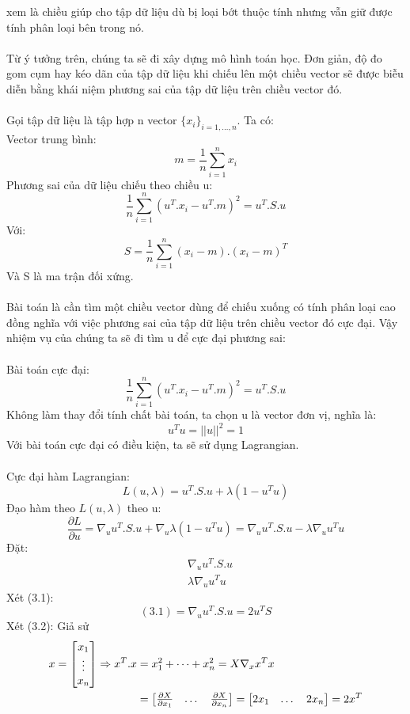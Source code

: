 xem là chiều giúp cho tập dữ liệu dù bị loại bớt thuộc tính nhưng vẫn giữ được
tính phân loại bên trong nó.\\\\ 
 Từ ý tưởng trên, chúng ta sẽ đi xây dựng
mô hình toán học. Đơn giản, độ đo gom cụm hay kéo dãn của tập dữ liệu khi chiếu
lên một chiều vector sẽ được biễu diễn bằng khái niệm phương sai của tập dữ liệu
trên chiều vector đó.\\\\
Gọi tập dữ liệu là tập hợp n vector $\{x_i\}_{i=1,\dots,n}$. Ta có:\\
Vector trung bình:
\[ m = \frac{1}{n} \sum_{i=1}^{n} x_i \]
Phương sai của dữ liệu chiếu theo chiều u:
\[ \frac{1}{n}\sum_{i=1}^{n} (u^T.x_i - u^T.m)^2 = u^T.S.u \]
Với:
\[ S= \frac{1}{n}\sum_{i=1}^n (x_i-m).(x_i-m)^T \]
Và S là ma trận đối xứng.\\\\
Bài toán là cần tìm một chiều vector dùng để chiếu xuống có tính phân loại cao
đồng nghĩa với việc phương sai của tập dữ liệu trên chiều vector đó cực đại. Vậy
nhiệm vụ của chúng ta sẽ đi tìm u để cực đại phương sai:\\\\
Bài toán cực đại:
\[ \frac{1}{n}\sum_{i=1}^{n} (u^T.x_i - u^T.m)^2 = u^T.S.u \]
Không làm thay đổi tính chất bài toán, ta chọn u là vector đơn vị, nghĩa là:
\[ u^Tu= ||u||^2= 1 \]
Với bài toán cực đại có điều kiện, ta sẽ sử dụng Lagrangian.\\\\
Cực đại hàm Lagrangian:
\[ L(u,\lambda) = u^T.S.u + \lambda(1-u^Tu) \]
Đạo hàm theo $L(u,\lambda)$ theo u:
\[ \frac{\partial L}{\partial u} = \nabla_u u^T.S.u + \nabla_u \lambda(1-u^Tu) =
\nabla_uu^T.S.u -\lambda \nabla_uu^Tu \] 
Đặt:
\begin{align}
& \nabla_uu^T.S.u\\
& \lambda \nabla_uu^Tu
\end{align}
Xét (3.1):
\[ (3.1) = \nabla_uu^T.S.u = 2u^TS \]
Xét (3.2):
Giả sử
\begin{align}
x = \begin{bmatrix} x_1 \\ \vdots \\ x_n \end{bmatrix} \Rightarrow
x^T.x & = x_1^2 + \dots + x_n^2 = X
\nabla_xx^Tx \notag\\
& = \begin{bmatrix} \frac{\partial X}{\partial x_1} & \dots &
\frac{\partial X}{\partial x_n} \end{bmatrix} = \begin{bmatrix}
2x_1 & \dots & 2x_n \end{bmatrix} = 2x^T\notag
\end{align}
